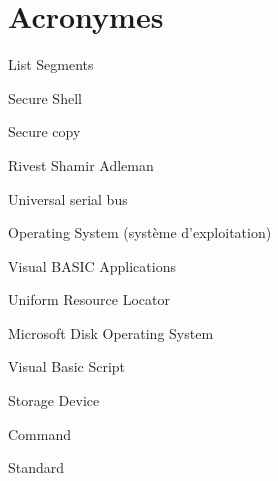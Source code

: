 \chapter{Acronymes}\label{acronyms}


\begin{acronym}
  {List Segments}
\end{acronym}

\begin{acronym}
  {Secure Shell}
\end{acronym}

\begin{acronym}
  {Secure copy}
\end{acronym}

\begin{acronym}
  {Rivest Shamir Adleman}
\end{acronym}

\begin{acronym}
  {Universal serial bus}
\end{acronym}

\begin{acronym}
  {Operating System (système d'exploitation)}
\end{acronym}

\begin{acronym}
  {Visual BASIC Applications}
\end{acronym}

\begin{acronym}
  {Uniform Resource Locator}
\end{acronym}

\begin{acronym}
  {Microsoft Disk Operating System}
\end{acronym}

\begin{acronym}
  {Visual Basic Script}
\end{acronym}

\begin{acronym}
  {Storage Device}
\end{acronym}

\begin{acronym}
  {Command}
\end{acronym}

\begin{acronym}
  {Standard}
\end{acronym}

